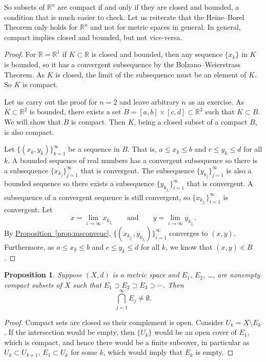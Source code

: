 \documentclass[12pt,openany]{book}
\newcommand{\R}{{\mathbb{R}}}
\theoremstyle{plain}
\newtheorem{prop}[thm]{Proposition}
\theoremstyle{remark}
\theoremstyle{definition}
\theoremstyle{exercise}
\theoremstyle{example}
\newcommand{\propref}[1]{\hyperref[#1]{Proposition~\ref*{#1}}}
\begin{document}
So subsets of $\R^n$ are compact if and only if they are closed and bounded,
a condition that is much easier to check.
Let us reiterate that the Heine--Borel Theorem only holds for $\R^n$ and not
for metric spaces in general.  In general, compact implies closed and
bounded, but not vice-versa.

\begin{proof}
For $\R = \R^1$ if $K \subset \R$ is closed and bounded, then
any sequence $\{ x_k \}$ in $K$ is bounded, so it has a convergent
subsequence by
the Bolzano--Weierstrass Theorem.
As $K$ is closed, the limit of the subsequence must be an element of
$K$.  So $K$ is compact.

Let us carry out the proof for $n=2$ and leave arbitrary $n$ as an exercise.
As $K \subset \R^2$ is bounded, there exists a set
$B=[a,b]\times[c,d] \subset \R^2$ such that $K \subset B$.  We will show
that $B$ is compact.  Then $K$, being a closed subset of a compact $B$, is
also compact.  

Let $\bigl\{ (x_k,y_k) \bigr\}_{k=1}^\infty$ be a sequence in $B$.  That is,
$a \leq x_k \leq b$ and
$c \leq y_k \leq d$ for all $k$.  A bounded sequence of real numbers
has a convergent
subsequence so there is a subsequence $\{ x_{k_j} \}_{j=1}^\infty$
that is convergent.  The subsequence 
$\{ y_{k_j} \}_{j=1}^\infty$ is also a bounded sequence so there exists
a subsequence
$\{ y_{k_{j_i}} \}_{i=1}^\infty$ that is convergent.  A subsequence of a
convergent sequence is still convergent, so 
$\{ x_{k_{j_i}} \}_{i=1}^\infty$ is convergent.
Let
\begin{equation*}
x = \lim_{i\to\infty} x_{k_{j_i}}
\qquad \text{and} \qquad
y = \lim_{i\to\infty} y_{k_{j_i}} .
\end{equation*}
By \propref{prop:msconveuc},
$\bigl\{ (x_{k_{j_i}},y_{k_{j_i}}) \bigr\}_{i=1}^\infty$ converges to $(x,y)$.
Furthermore, as $a \leq x_k \leq b$ and
$c \leq y_k \leq d$ for all $k$, we know that $(x,y) \in B$.
\end{proof}

\begin{prop}
Suppose $(X,d)$ is a metric space
and $E_1$, $E_2$, \ldots, are
nonempty compact subsets of $X$ such that
$E_1 \supset E_2 \supset E_3 \supset \cdots$.  Then
\begin{equation*}
\bigcap_{j=1}^\infty E_j \not= \emptyset .
\end{equation*}
\end{prop}

\begin{proof}
Compact sets are closed so their complement is open.  Consider
$U_k = X \setminus E_k$.  If the intersection would be empty,
then $\{ U_k \}$ would be an open cover of $E_1$, which is compact,
and hence there would be a finite subcover, in particular
as $U_k \subset U_{k+1}$, $E_1 \subset U_k$ for some $k$, which would imply
that $E_k$ is empty.
\end{proof}
\end{document}
